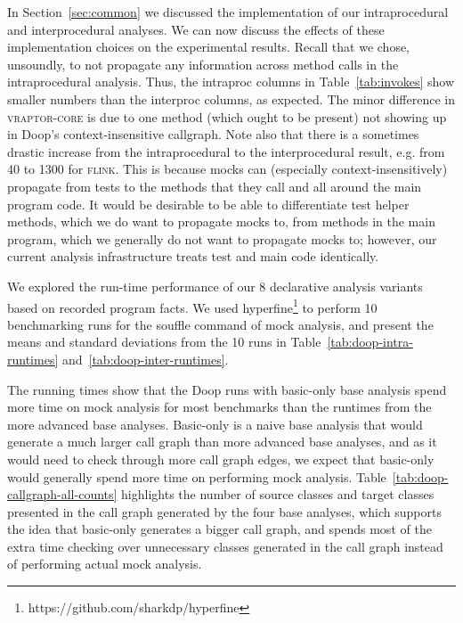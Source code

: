 In Section~\ref{sec:common} we discussed the implementation of our intraprocedural and interprocedural analyses. We can now discuss the effects of these implementation choices on the experimental results. Recall that we chose, unsoundly, to not propagate any information across method calls in the intraprocedural analysis. Thus, the intraproc columns in Table~\ref{tab:invokes} show smaller numbers than the interproc columns, as expected. The minor difference in \textsc{vraptor-core} is due to one method (which ought to be present) not showing up in Doop's context-insensitive callgraph. Note also that there is a sometimes drastic increase from the intraprocedural to the interprocedural result, e.g. from 40 to 1300 for \textsc{flink}. This is because mocks can (especially context-insensitively) propagate from tests to the methods that they call and all around the main program code. It would be desirable to be able to differentiate test helper methods, which we do want to propagate mocks to, from methods in the main program, which we generally do not want to propagate mocks to; however, our current analysis infrastructure treats test and main code identically.



We explored the run-time performance of our 8 declarative analysis variants based on recorded program facts. We used hyperfine\footnote{https://github.com/sharkdp/hyperfine} to perform 10 benchmarking runs for the souffle command of mock analysis, and present the means and standard deviations from the 10 runs in Table~\ref{tab:doop-intra-runtimes} and~\ref{tab:doop-inter-runtimes}.

The running times show that the Doop runs with basic-only base analysis spend more time on mock analysis for most benchmarks than the runtimes from the more advanced base analyses. Basic-only is a naive base analysis that would generate a much larger call graph than more advanced base analyses, and as it would need to check through more call graph edges, we expect that basic-only would generally spend more time on performing mock analysis. Table~\ref{tab:doop-callgraph-all-counts} highlights the number of source classes and target classes presented in the call graph generated by the four base analyses, which supports the idea that basic-only generates a bigger call graph, and spends most of the extra time checking over unnecessary classes generated in the call graph instead of performing actual mock analysis.

